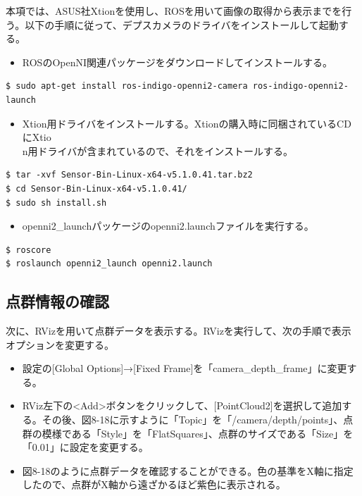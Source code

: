 本項では、ASUS社Xtionを使用し、ROSを用いて画像の取得から表示までを行う。以下の手順に従って、デプスカメラのドライバをインストールして起動する。

\begin{itemize}
\item ROSのOpenNI関連パッケージをダウンロードしてインストールする。
\end{itemize}

\begin{lstlisting}[language=ROS]
$ sudo apt-get install ros-indigo-openni2-camera ros-indigo-openni2-launch
\end{lstlisting}

\begin{itemize}
\item Xtion用ドライバをインストールする。Xtionの購入時に同梱されているCDにXtio\\n用ドライバが含まれているので、それをインストールする。
\end{itemize}

\begin{lstlisting}[language=ROS]
$ tar -xvf Sensor-Bin-Linux-x64-v5.1.0.41.tar.bz2
$ cd Sensor-Bin-Linux-x64-v5.1.0.41/
$ sudo sh install.sh
\end{lstlisting}

\begin{itemize}
\item openni2\_launchパッケージのopenni2.launchファイルを実行する。
\end{itemize}

\begin{lstlisting}[language=ROS]
$ roscore
$ roslaunch openni2_launch openni2.launch
\end{lstlisting}

\subsection{点群情報の確認}

次に、RVizを用いて点群データを表示する。RVizを実行して、次の手順で表示オプションを変更する。

\begin{itemize}
\item 設定の[Global Options]→[Fixed Frame]を「camera\_depth\_frame」に変更する。
\item RViz左下の<Add>ボタンをクリックして、[PointCloud2]を選択して追加する。その後、図8-18に示すように「Topic」を「/camera/depth/points」、点群の模様である「Style」を「FlatSquares」、点群のサイズである「Size」を「0.01」に設定を変更する。
\item 図8-18のように点群データを確認することができる。色の基準をX軸に指定したので、点群がX軸から遠ざかるほど紫色に表示される。
\end{itemize}

